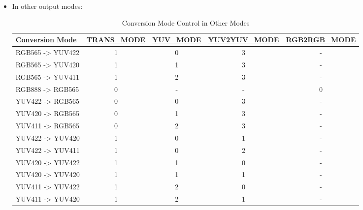 \documentclass[main\_\_EN.tex]{subfiles}
\begin{document}
\begin{enumerate}
\begin{itemize}
    \item In other output modes:
               \begin{table}[H]
            \caption{Conversion Mode Control in Other Modes}
            \centering
            \begin{threeparttable}
            \begin{tabular}{|l|c|c|c|c|}
            \hline
            \rowcolor{lightgray}
            \textbf{Conversion Mode} & \textbf{\hyperref[fielddesc:LCDCAMLCDCONVTRANSMODE]{TRANS\_MODE}}\tnote{1} & \textbf{\hyperref[fielddesc:LCDCAMLCDCONVYUVMODE]{YUV\_MODE}}\tnote{2} & \textbf{\hyperref[fielddesc:LCDCAMLCDCONVYUV2YUVMODE]{YUV2YUV\_MODE}}\tnote{3} &
            \textbf{\hyperref[fielddesc:LCDCAMLCDCONVRGB2RGBMODE]{RGB2RGB\_MODE}}\tnote{4} \\ \hline            
            RGB565 -> YUV422 & 1 & 0 & 3 & - \\ \hline
            RGB565 -> YUV420 & 1 & 1 & 3 & - \\ \hline
            RGB565 -> YUV411 & 1 & 2 & 3 & - \\ \hline
            RGB888 -> RGB565 & 0 & - & - & 0 \\ \hline
            YUV422 -> RGB565 & 0 & 0 & 3 & - \\ \hline
            YUV420 -> RGB565 & 0 & 1 & 3 & - \\ \hline
            YUV411 -> RGB565 & 0 & 2 & 3 & - \\ \hline
            YUV422 -> YUV420 & 1 & 0 & 1 & - \\ \hline
            YUV422 -> YUV411 & 1 & 0 & 2 & - \\ \hline
            YUV420 -> YUV422 & 1 & 1 & 0 & - \\ \hline
            YUV420 -> YUV420 & 1 & 1 & 1 & - \\ \hline
            YUV411 -> YUV422 & 1 & 2 & 0 & - \\ \hline
            YUV411 -> YUV420 & 1 & 2 & 1 & - \\ \hline
            \end{tabular}
        

\end{threeparttable}
\end{table}
\end{itemize}
\end{enumerate}
\end{document}

